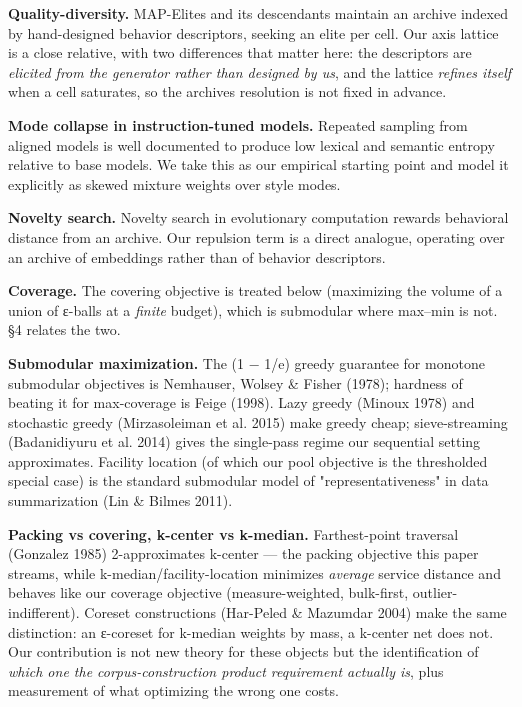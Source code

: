 \documentclass[
  10pt,
]{article}
\theoremstyle{plain}
\theoremstyle{definition}
\begin{document}
\textbf{Quality-diversity.} MAP-Elites and its descendants maintain an
archive indexed by hand-designed behavior descriptors, seeking an elite
per cell. Our axis lattice is a close relative, with two differences
that matter here: the descriptors are \emph{elicited from the generator
rather than designed by us}, and the lattice \emph{refines itself} when
a cell saturates, so the archive\textquotesingle s resolution is not
fixed in advance.

\textbf{Mode collapse in instruction-tuned models.} Repeated sampling
from aligned models is well documented to produce low lexical and
semantic entropy relative to base models. We take this as our empirical
starting point and model it explicitly as skewed mixture weights over
style modes.

\textbf{Novelty search.} Novelty search in evolutionary computation
rewards behavioral distance from an archive. Our repulsion term is a
direct analogue, operating over an archive of embeddings rather than of
behavior descriptors.

\textbf{Coverage.} The covering objective is treated below (maximizing
the volume of a union of ε-balls at a \emph{finite} budget), which is
submodular where max--min is not. §4 relates the two.

\textbf{Submodular maximization.} The (1 − 1/e) greedy guarantee for
monotone submodular objectives is Nemhauser, Wolsey \& Fisher (1978);
hardness of beating it for max-coverage is Feige (1998). Lazy greedy
(Minoux 1978) and stochastic greedy (Mirzasoleiman et al. 2015) make
greedy cheap; sieve-streaming (Badanidiyuru et al. 2014) gives the
single-pass regime our sequential setting approximates. Facility
location (of which our pool objective is the thresholded special case)
is the standard submodular model of "representativeness" in data
summarization (Lin \& Bilmes 2011).

\textbf{Packing vs covering, k-center vs k-median.} Farthest-point
traversal (Gonzalez 1985) 2-approximates k-center --- the packing
objective this paper streams, while k-median/facility-location minimizes
\emph{average} service distance and behaves like our coverage objective
(measure-weighted, bulk-first, outlier-indifferent). Coreset
constructions (Har-Peled \& Mazumdar 2004) make the same distinction: an
ε-coreset for k-median weights by mass, a k-center net does not. Our
contribution is not new theory for these objects but the identification
of \emph{which one the corpus-construction product requirement actually
is}, plus measurement of what optimizing the wrong one costs.
\end{document}
